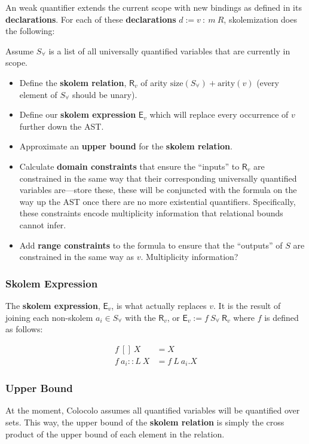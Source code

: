 \documentclass{article}
\theoremstyle{definition}
\begin{document}
    An weak quantifier extends the current scope with new bindings as defined in its \textbf{declarations}. For each of these \textbf{declarations} $d := v~:~m~R$, skolemization does the following:

    Assume $S_\forall$ is a list of all universally quantified variables that are currently in scope.

    \begin{itemize}
        \item Define the \textbf{skolem relation}, $\textsf{R}_v$ of arity $\text{size}(S_\forall) + \text{arity}(v)$ (every element of $S_\forall$ should be unary).
        \item Define our \textbf{skolem expression} $\textsf{E}_v$ which will replace every occurrence of $v$ further down the AST.
        \item Approximate an \textbf{upper bound} for the \textbf{skolem relation}.
        \item Calculate \textbf{domain constraints} that ensure the ``inputs'' to $\textsf{R}_v$ are constrained in the same way that their corresponding universally quantified variables are---store these, these will be conjuncted with the formula on the way up the AST once there are no more existential quantifiers. Specifically, these constraints encode multiplicity information that relational bounds cannot infer.
        \item Add \textbf{range constraints} to the formula to ensure that the ``outputs'' of $S$ are constrained in the same way as $v$. Multiplicity information?
    \end{itemize}

    \subsubsection*{Skolem Expression}

    The \textbf{skolem expression}, $\textsf{E}_v$, is what actually replaces $v$. It is the result of joining each non-skolem $a_i \in S_\forall$ with the $\textsf{R}_v$, or $\textsf{E}_v := f~S_\forall~\textsf{R}_v$ where $f$ is defined as follows:
    
    \begin{align*}
        f~[]~X& = X\\
        f~a_i::L~X& = f~L~a_i.X
    \end{align*}

    \subsubsection*{Upper Bound}
    At the moment, Colocolo assumes all quantified variables will be quantified over sets. This way, the upper bound of the \textbf{skolem relation} is simply the cross product of the upper bound of each element in the relation.
\end{document}
